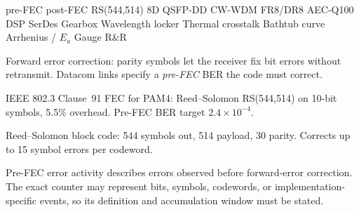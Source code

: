 \makeatletter
\newcommand{\declaretermsnip}[2]{\expandafter\gdef\csname termsnip@#1\endcsname{#2}}
\newcommand{\declaretermlabel}[2]{\expandafter\gdef\csname termlabel@#1\endcsname{#2}}
\newcommand{\termsnip@note}[1]{%
  \marginnote{\textbf{\ifcsname termlabel@#1\endcsname
      \csname termlabel@#1\endcsname\else#1\fi}%
    \ \csname termsnip@#1\endcsname}%
}
\newcommand{\firstterm}[1]{%
  \expandafter\ifx\csname termused@#1\endcsname\relax
    \expandafter\gdef\csname termused@#1\endcsname{}%
    \ifcsname termsnip@#1\endcsname
      \termsnip@note{#1}%
    \fi
  \fi
}
\newcommand{\termnote}[1]{%
  \ifcsname termsnip@#1\endcsname
    \termsnip@note{#1}%
  \fi
}
\makeatother

\declaretermlabel{preFEC}{pre-FEC}
\declaretermlabel{postFEC}{post-FEC}
\declaretermlabel{RS544514}{RS(544,514)}
\declaretermlabel{eightD}{8D}
\declaretermlabel{QSFPDD}{QSFP-DD}
\declaretermlabel{CWWDM}{CW-WDM}
\declaretermlabel{FR8DR8}{FR8/DR8}
\declaretermlabel{AECQ100}{AEC-Q100}
\declaretermlabel{dspserdes}{DSP SerDes}
\declaretermlabel{gearbox}{Gearbox}
\declaretermlabel{wavelengthLocker}{Wavelength locker}
\declaretermlabel{thermalCrosstalk}{Thermal crosstalk}
\declaretermlabel{bathtub}{Bathtub curve}
\declaretermlabel{Arrhenius}{Arrhenius / $E_a$}
\declaretermlabel{gaugeRR}{Gauge R\&R}

\declaretermsnip{FEC}{Forward error correction: parity symbols let the receiver fix
  bit errors without retransmit. Datacom links specify a \emph{pre-FEC} BER the code
  must correct.}

\declaretermsnip{KP4}{IEEE 802.3 Clause~91 FEC for PAM4: Reed--Solomon RS(544,514) on
  10-bit symbols, 5.5\% overhead. Pre-FEC BER target $2.4\times10^{-4}$.}

\declaretermsnip{RS544514}{Reed--Solomon block code: 544 symbols out, 514 payload, 30
  parity. Corrects up to 15 symbol errors per codeword.}

\declaretermsnip{preFEC}{Pre-FEC error activity describes errors observed before
  forward-error correction. The exact counter may represent bits, symbols,
  codewords, or implementation-specific events, so its definition and
  accumulation window must be stated.}

